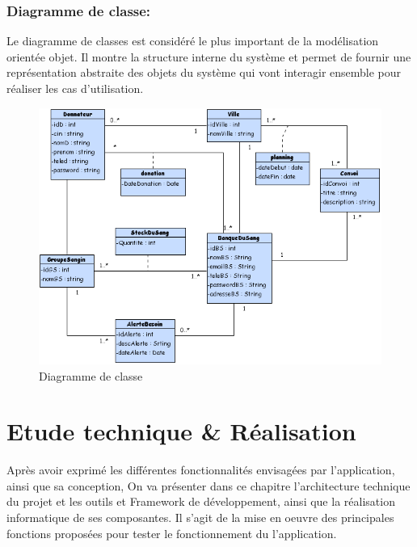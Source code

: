 \documentclass[12pt,a4paper,twoside]{report}
\begin{document}
{		\subsection{Diagramme de classe:}{
			Le diagramme de classes est considéré le plus important de la modélisation orientée objet. Il montre la structure interne du système et permet de fournir une représentation abstraite des objets du système qui vont interagir ensemble pour réaliser les cas d’utilisation.
				\begin{figure}[H]
					 \includegraphics[width=15cm]{Images/class.png}
					 \centering
					 \caption{\label{classe} Diagramme de classe}
				\end{figure}
		}
	}
	
	\newpage
	
	\chapter{Etude technique \& Réalisation}{
		Après avoir exprimé les différentes fonctionnalités envisagées par l’application, ainsi que sa conception, On va présenter dans ce chapitre l’architecture technique du projet et les outils et Framework de développement, ainsi que la réalisation informatique de ses composantes. Il s’agit de la mise en oeuvre des principales fonctions proposées pour tester le fonctionnement du l’application.
	\newpage
	}
\end{document}
